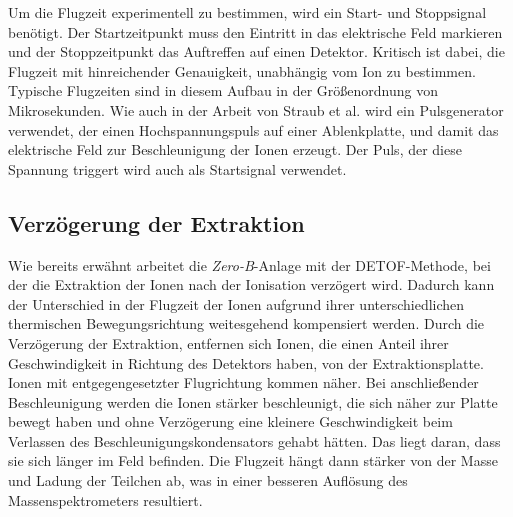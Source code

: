 Um die Flugzeit experimentell zu bestimmen, wird ein Start- und Stoppsignal benötigt. Der Startzeitpunkt muss den Eintritt in das elektrische Feld markieren und der Stoppzeitpunkt das Auftreffen auf einen Detektor. Kritisch ist dabei, die Flugzeit mit hinreichender Genauigkeit, unabhängig vom Ion zu bestimmen. Typische Flugzeiten sind in diesem Aufbau in der Größenordnung von Mikrosekunden. Wie auch in der Arbeit von Straub et al. \cite{Straub} wird ein Pulsgenerator verwendet, der einen Hochspannungspuls auf einer Ablenkplatte, und damit das elektrische Feld zur Beschleunigung der Ionen erzeugt. Der Puls, der diese Spannung triggert wird auch als Startsignal verwendet.

\subsection{Verzögerung der Extraktion}
Wie bereits erwähnt arbeitet die \textit{Zero-B}-Anlage mit der \textsc{DETOF}-Methode, bei der die Extraktion der Ionen nach der Ionisation verzögert wird. Dadurch kann der Unterschied in der Flugzeit der Ionen aufgrund ihrer unterschiedlichen thermischen Bewegungsrichtung weitesgehend kompensiert werden. Durch die Verzögerung der Extraktion, entfernen sich Ionen, die einen Anteil ihrer Geschwindigkeit in Richtung des Detektors haben, von der Extraktionsplatte. Ionen mit entgegengesetzter Flugrichtung kommen näher. Bei anschließender Beschleunigung werden die Ionen stärker beschleunigt, die sich näher zur Platte bewegt haben und ohne Verzögerung eine kleinere Geschwindigkeit beim Verlassen des Beschleunigungskondensators gehabt hätten. Das liegt daran, dass sie sich länger im Feld befinden. Die Flugzeit hängt dann stärker von der Masse und Ladung der Teilchen ab, was in einer besseren Auflösung des Massenspektrometers resultiert.

